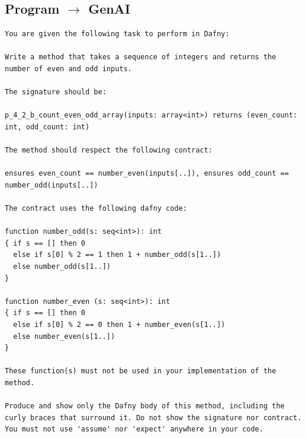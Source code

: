 \documentclass{article}
\begin{document}
\subsection*{Program $\rightarrow$ GenAI}
\begin{lstlisting}
You are given the following task to perform in Dafny:

Write a method that takes a sequence of integers and returns the number of even and odd inputs.

The signature should be:

p_4_2_b_count_even_odd_array(inputs: array<int>) returns (even_count: int, odd_count: int)

The method should respect the following contract:

ensures even_count == number_even(inputs[..]), ensures odd_count == number_odd(inputs[..])

The contract uses the following dafny code:

function number_odd(s: seq<int>): int
{ if s == [] then 0
  else if s[0] % 2 == 1 then 1 + number_odd(s[1..])
  else number_odd(s[1..])
}

function number_even (s: seq<int>): int
{ if s == [] then 0
  else if s[0] % 2 == 0 then 1 + number_even(s[1..])
  else number_even(s[1..])
}

These function(s) must not be used in your implementation of the method.

Produce and show only the Dafny body of this method, including the curly braces that surround it. Do not show the signature nor contract. You must not use 'assume' nor 'expect' anywhere in your code.
\end{lstlisting}
\end{document}
